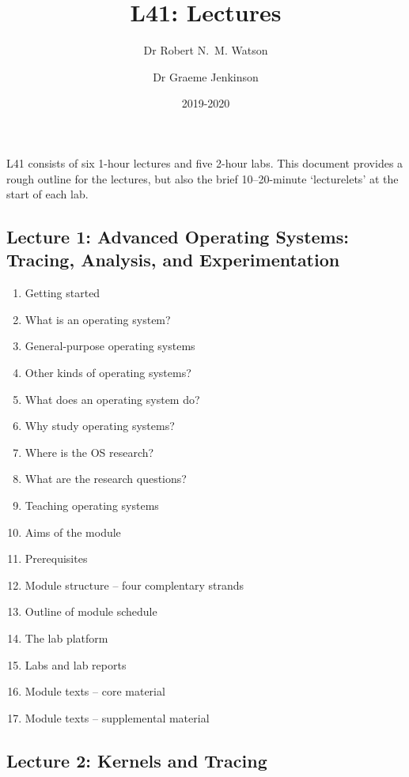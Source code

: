\documentclass[a4paper,10pt]{article}
\begin{document}
\title{L41: Lectures}
\author{Dr Robert N.~M. Watson \and Dr Graeme Jenkinson}
\date{2019-2020}
\maketitle

\noindent
L41 consists of six 1-hour lectures and five 2-hour labs.
This document provides a rough outline for the lectures, but also the brief
10--20-minute `lecturelets' at the start of each lab.

\subsection*{Lecture 1: Advanced Operating Systems: Tracing, Analysis, and
  Experimentation}

\begin{enumerate}
  \item Getting started
  \item What is an operating system?
  \item General-purpose operating systems
  \item Other kinds of operating systems?
  \item What does an operating system do?
  \item Why study operating systems?
  \item Where is the OS research?
  \item What are the research questions?
  \item Teaching operating systems
  \item Aims of the module
  \item Prerequisites
  \item Module structure -- four complentary strands
  \item Outline of module schedule
  \item The lab platform
  \item Labs and lab reports
  \item Module texts -- core material
  \item Module texts -- supplemental material
\end{enumerate}

\subsection*{Lecture 2: Kernels and Tracing}
\end{document}
